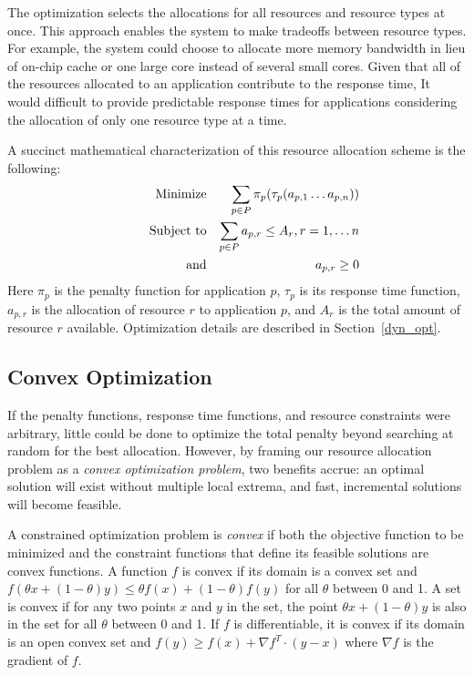 The optimization selects the allocations for all resources and resource types at once.  This approach enables the system to make tradeoffs between resource types.  For example, the system could choose to allocate more memory bandwidth in lieu of on-chip cache or one large core instead of several small cores.  Given that all of the resources allocated to an application contribute to the response time, It would difficult to provide predictable response times for applications considering the allocation of only one resource type at a time.

A succinct mathematical characterization of this resource allocation scheme is the following:
\begin{eqnarray*}
& \makebox[1in][r]{Minimize}   & \sum_{p\in P} {\pi_p(\tau_p(a_{p,1}\ldots a_{p,n}))}  \\
& \makebox[1in][r]{Subject to} & \sum_{p\in P} a_{p,r} \leq A_r, r = 1,\ldots n        \\
& \makebox[1in][r]{and}        & a_{p,r} \geq 0
\end{eqnarray*}
Here $\pi_p$ is the penalty function for application $p$,
$\tau_p$ is its response time function,
$a_{p,r}$ is the allocation of resource $r$ to application $p$,
and $A_r$ is the total amount of resource $r$ available.  Optimization details are described in Section~\ref{dyn_opt}.

\subsection*{Convex Optimization}
If the penalty functions, response time functions, and resource constraints were arbitrary,
little could be done to optimize the total penalty beyond searching at random for the best allocation.
However, by framing our resource allocation problem as a \emph{convex optimization problem}\cite{BoVa},
two benefits accrue: an optimal solution will exist without multiple local extrema, and
fast, incremental solutions will become feasible.

A constrained optimization problem is \emph{convex} if both the objective function to be minimized
and the constraint functions that define its feasible solutions are convex functions.
A function $f$ is convex if its domain is a convex set and
$f(\theta x + (1-\theta)y) \leq \theta f(x) + (1-\theta)f(y)$
for all $\theta$ between 0 and 1.
A set is convex if for any two points $x$ and $y$ in the set, the point
$\theta x + (1-\theta)y$
is also in the set for all $\theta$ between 0 and 1.
If $f$ is differentiable, it is convex if its domain is an open convex set and
$f(y) \geq f(x) + \nabla f^T\cdot(y-x)$ where $\nabla f$ is the gradient of $f$.

